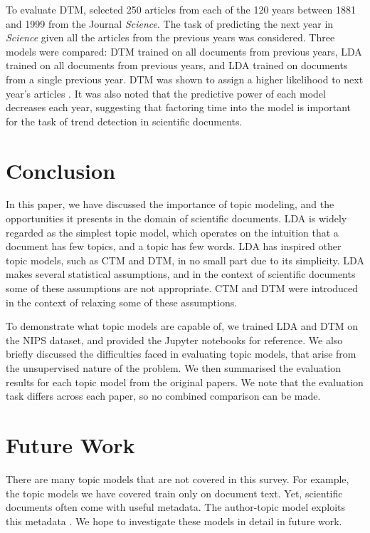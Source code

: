 \documentclass[letterpaper]{article}
\begin{document}
To evaluate DTM, \citeauthor{blei2006dynamic} selected 250 articles
from each of the 120 years between 1881 and 1999 from the Journal
\textit{Science}. The task of predicting the next year in
\textit{Science} given all the articles from the previous years was
considered. Three models were compared: DTM trained on all documents
from previous years, LDA trained on all documents from previous years,
and LDA trained on documents from a single previous year. DTM was
shown to assign a higher likelihood to next year's articles
\cite{blei2006dynamic}. It was also noted that the predictive power of
each model decreases each year, suggesting that factoring time into
the model is important for the task of trend detection in scientific
documents.

\section{Conclusion}
In this paper, we have discussed the importance of topic modeling, and
the opportunities it presents in the domain of scientific documents.
LDA is widely regarded as the simplest topic model, which operates on
the intuition that a document has few topics, and a topic has few
words. LDA has inspired other topic models, such as CTM and DTM, in no
small part due to its simplicity. LDA makes several statistical
assumptions, and in the context of scientific documents some of these
assumptions are not appropriate. CTM and DTM were introduced in
the context of relaxing some of these assumptions.

To demonstrate what topic models are capable of, we trained LDA and
DTM on the NIPS dataset, and provided the Jupyter notebooks for
reference. We also briefly discussed the difficulties faced in
evaluating topic models, that arise from the unsupervised nature of
the problem. We then summarised the evaluation results for each topic
model from the original papers. We note that the evaluation task
differs across each paper, so no combined comparison can be made.

\section{Future Work}
There are many topic models that are not covered in this survey. For
example, the topic models we have covered train only on document text.
Yet, scientific documents often come with useful metadata. The
author-topic model exploits this metadata \cite{rosen2004author}. We
hope to investigate these models in detail in future work.
\end{document}

